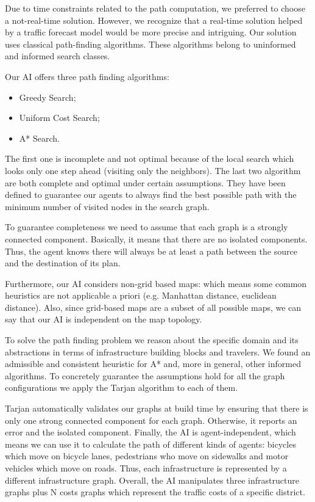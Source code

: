 
Due to time constraints related to the path computation, we preferred to
choose a not-real-time solution. However, we recognize that a real-time solution
helped by a traffic forecast model would be more precise and intriguing.
Our solution uses classical path-finding algorithms. These algorithms
belong to uninformed and informed search classes.

Our AI offers three path finding algorithms:
\begin{itemize}
  \item Greedy Search;
  \item Uniform Cost Search;
  \item A* Search.
\end{itemize}

The first one is incomplete and not optimal because of the local search which
looks only one step ahead (visiting
only the neighbors). The last two algorithm are both complete and optimal
under certain assumptions. They have been defined
to guarantee our agents to always find the best possible path with
the minimum number of visited nodes in the search graph.


To guarantee completeness we need to assume that each graph is a strongly
connected component. Basically, it means that there are no isolated
components. Thus, the agent knows there will always be at least a path between
the source and the destination of its plan. %

Furthermore, our AI considers non-grid based maps: which means some common
heuristics are not applicable a priori (e.g. Manhattan distance, euclidean
distance). Also, since grid-based maps are a subset of all possible maps, we
can say that our AI is independent on the map topology.

To solve the path finding problem we reason about the specific domain and its
abstractions in terms of infrastructure building blocks and travelers. We
found an admissible and consistent heuristic for A* and, more in general, other
informed algorithms. To concretely guarantee the assumptions hold for all the
graph configurations we apply the Tarjan algorithm to each of them.

Tarjan automatically validates our graphs at build time by ensuring that there
is only one strong connected component for each graph. Otherwise, it reports
an error and the isolated component.
Finally, the AI is agent-independent, which means we can use it to calculate
the path of different kinds of agents: bicycles which move on bicycle lanes,
pedestrians who move on sidewalks and motor vehicles which move on roads.
Thus, each infrastructure is represented by a different infrastructure graph.
Overall, the AI manipulates three infrastructure graphs plus N costs graphs
which represent the traffic costs of a specific district.

